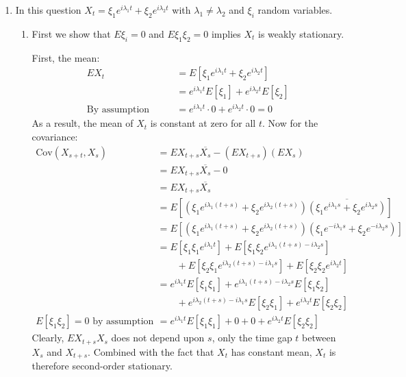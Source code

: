 \documentclass[12pt]{article}
\theoremstyle{plain}
\theoremstyle{definition}
\theoremstyle{remark}
\begin{document}
\begin{enumerate}
  \item %
    In this question $X_t = \xi_1 e^{i\lambda_1 t} + \xi_2
    e^{i\lambda_2 t}$ with $\lambda_1 \neq \lambda_2$ and $\xi_i$ random
    variables.
    \begin{enumerate}
      \item %
        First we show that $E\xi_i=0$ and $E\xi_1\xi_2=0$ implies $X_t$
        is weakly stationary.

        First, the mean:
        \begin{align*}
          EX_t &= E[ \xi_1 e^{i\lambda_1 t} + \xi_2e^{i\lambda_2 t}] \\
          &=  e^{i\lambda_1 t}E[ \xi_1] + e^{i\lambda_2 t}E[\xi_2] \\
          \text{By assumption} \qquad
          &=  e^{i\lambda_1 t}\cdot 0 + e^{i\lambda_2 t}\cdot 0 = 0
        \end{align*}
        As a result, the mean of $X_t$ is constant at zero for all $t$.
        Now for the covariance:
        \begin{align*}
          \text{Cov}(X_{s+t},X_s) &= EX_{t+s}\overline{X_s} -(EX_{t+s})(EX_s) \\
          &=  EX_{t+s}\overline{X_s}-0 \\
          &= EX_{t+s}\overline{X_s}\\
          &= E[( \xi_1 e^{i\lambda_1 (t+s)} + \xi_2e^{i\lambda_2 (t+s)})
            \overline{( \xi_1 e^{i\lambda_1 s} + \xi_2e^{i\lambda_2 s})}]\\
          &= E[ (\xi_1 e^{i\lambda_1 (t+s)} + \xi_2e^{i\lambda_2 (t+s)})
            ( {\xi_1} e^{-i\lambda_1 s} + {\xi_2}e^{-i\lambda_2 s})]\\
          &= E[ \xi_1{\xi_1} e^{i\lambda_1 t}]
             + E[ \xi_1{\xi_2} e^{i\lambda_1 (t+s)-i\lambda_2 s}]\\
          &\qquad
             + E[ \xi_2{\xi_1} e^{i\lambda_2 (t+s)-i\lambda_1 s}]
            + E[ \xi_2{\xi_2} e^{i\lambda_2 t}] \\
          &= e^{i\lambda_1 t}E[ \xi_1{\xi_1} ]
             + e^{i\lambda_1 (t+s)-i\lambda_2 s}E[ \xi_1{\xi_2} ]\\
          &\qquad
             + e^{i\lambda_2 (t+s)-i\lambda_1 s}E[ \xi_2{\xi_1}]
            + e^{i\lambda_2 t}E[ \xi_2{\xi_2} ] \\
          \text{$E[\xi_1\xi_2] =0$ by assumption} \quad
          &= e^{i\lambda_1 t}E[ \xi_1{\xi_1} ]
             +0 +0
            + e^{i\lambda_2 t}E[ \xi_2{\xi_2} ]
        \end{align*}
        Clearly, $EX_{t+s}X_s$ does not depend upon $s$, only the time
        gap $t$ between $X_{s}$ and $X_{t+s}$.  Combined with the fact
        that $X_t$ has constant mean, $X_t$ is therefore second-order
        stationary.


\end{enumerate}
\end{enumerate}
\end{document}
